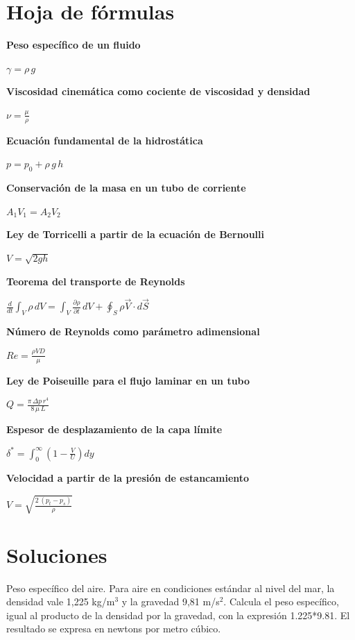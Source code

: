 \documentclass{book}
\begin{document}
\chapter{Hoja de fórmulas}

\noindent\textbf{Peso específico de un fluido}

\(\gamma = \rho\, g\)

\noindent\textbf{Viscosidad cinemática como cociente de viscosidad y densidad}

\(\nu = \frac{\mu}{\rho}\)

\noindent\textbf{Ecuación fundamental de la hidrostática}

\(p = p_0 + \rho\, g\, h\)

\noindent\textbf{Conservación de la masa en un tubo de corriente}

\(A_1 V_1 = A_2 V_2\)

\noindent\textbf{Ley de Torricelli a partir de la ecuación de Bernoulli}

\(V = \sqrt{2 g h}\)

\noindent\textbf{Teorema del transporte de Reynolds}

\(\frac{d}{dt}\int_{V} \rho\,dV = \int_{V} \frac{\partial \rho}{\partial t}\,dV + \oint_{S} \rho \vec{V}\cdot d\vec{S}\)

\noindent\textbf{Número de Reynolds como parámetro adimensional}

\(Re = \frac{\rho V D}{\mu}\)

\noindent\textbf{Ley de Poiseuille para el flujo laminar en un tubo}

\(Q = \frac{\pi\,\Delta p\, r^{4}}{8\,\mu\,L}\)

\noindent\textbf{Espesor de desplazamiento de la capa límite}

\(\delta^{*} = \int_{0}^{\infty}\left(1 - \frac{V}{U}\right) dy\)

\noindent\textbf{Velocidad a partir de la presión de estancamiento}

\(V = \sqrt{\frac{2\,(p_t - p_s)}{\rho}}\)
\chapter{Soluciones}

Peso específico del aire. Para aire en condiciones estándar al nivel del mar, la densidad vale 1,225 kg/m\(^{3}\) y la gravedad 9,81 m/s\(^{2}\). Calcula el peso específico, igual al producto de la densidad por la gravedad, con la expresión 1.225*9.81. El resultado se expresa en newtons por metro cúbico.
\end{document}
